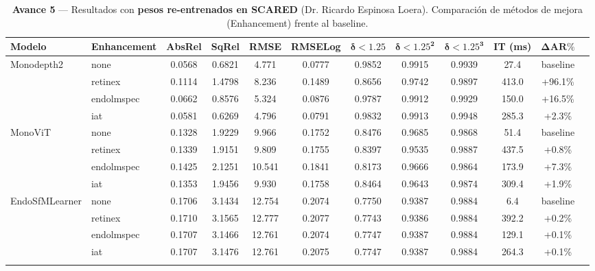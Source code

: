\documentclass{article}
\begin{document}
\begin{table}[htbp]
\centering
\small
\setlength{\tabcolsep}{5pt}
\renewcommand{\arraystretch}{1.15}

\caption{\textbf{Avance 5} — Resultados con \textbf{pesos re-entrenados en SCARED} (Dr. Ricardo Espinosa Loera). Comparación de métodos de mejora (Enhancement) frente al baseline.}
\label{tab:avance5}

\begin{tabular}{llccccccccc@{\hspace{12pt}}l}
\toprule
\textbf{Modelo} & \textbf{Enhancement} & \textbf{AbsRel} & \textbf{SqRel} & \textbf{RMSE} & \textbf{RMSELog} & $\mathbf{\delta < 1.25}$ & $\mathbf{\delta < 1.25^2}$ & $\mathbf{\delta < 1.25^3}$ & \textbf{IT (ms)} & \textbf{$\mathbf{\Delta\text{AR}\%}$} & \\
\midrule

Monodepth2 & none       & 0.0568 & 0.6821 &  4.771 & 0.0777 & 0.9852 & 0.9915 & 0.9939 &  27.4 & baseline  & \\
           & retinex    & 0.1114 & 1.4798 &  8.236 & 0.1489 & 0.8656 & 0.9742 & 0.9897 & 413.0 & +96.1\%   & \\
           & endolmspec & 0.0662 & 0.8576 &  5.324 & 0.0876 & 0.9787 & 0.9912 & 0.9929 & 150.0 & +16.5\%   & \\
           & iat        & 0.0581 & 0.6269 &  4.796 & 0.0791 & 0.9832 & 0.9913 & 0.9948 & 285.3 &  +2.3\%   & \\
\addlinespace[0.8em]

MonoViT & none       & 0.1328 & 1.9229 &  9.966 & 0.1752 & 0.8476 & 0.9685 & 0.9868 &  51.4 & baseline  & \\
        & retinex    & 0.1339 & 1.9151 &  9.809 & 0.1755 & 0.8397 & 0.9535 & 0.9887 & 437.5 &  +0.8\%   & \\
        & endolmspec & 0.1425 & 2.1251 & 10.541 & 0.1841 & 0.8173 & 0.9666 & 0.9864 & 173.9 &  +7.3\%   & \\
        & iat        & 0.1353 & 1.9456 &  9.930 & 0.1758 & 0.8464 & 0.9643 & 0.9874 & 309.4 &  +1.9\%   & \\
\addlinespace[0.8em]

EndoSfMLearner & none       & 0.1706 & 3.1434 & 12.754 & 0.2074 & 0.7750 & 0.9387 & 0.9884 &   6.4 & baseline  & \\
               & retinex    & 0.1710 & 3.1565 & 12.777 & 0.2077 & 0.7743 & 0.9386 & 0.9884 & 392.2 &  +0.2\%   & \\
               & endolmspec & 0.1707 & 3.1466 & 12.761 & 0.2074 & 0.7747 & 0.9387 & 0.9884 & 129.1 &  +0.1\%   & \\
               & iat        & 0.1707 & 3.1476 & 12.761 & 0.2075 & 0.7747 & 0.9387 & 0.9884 & 264.3 &  +0.1\%   & \\
\addlinespace[0.8em]


\end{tabular}
\end{table}
\end{document}

